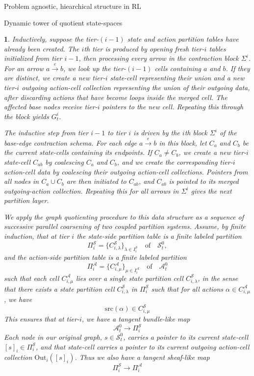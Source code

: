 \documentclass[11pt]{article}
\newtheorem{ermark}[subsubsection]{}
\begin{document}
\begin{section}{Problem agnostic, hiearchical structure in RL}
\begin{subsection}{Dynamic tower of quotient state-spaces}
\begin{ermark}
Inductively, suppose the tier-$(i-1)$ state and action partition tables have already been created. The $i$th tier is produced by opening fresh tier-$i$ tables initialized from tier $i-1$, then processing every arrow in the contraction block $\Sigma^i$. For an arrow $a\xrightarrow{\ e\ }b$, we look up the tier-$(i-1)$ cells containing $a$ and $b$. If they are distinct, we create a new tier-$i$ state-cell representing their union and a new tier-$i$ outgoing action-cell collection representing the union of their outgoing data, after discarding actions that have become loops inside the merged cell. The affected base nodes receive tier-$i$ pointers to the new cell. Repeating this through the block yields $G_t^i$.

The inductive step from tier $i-1$ to tier $i$ is driven by the $i$th block $\Sigma^i$ of the base-edge contraction schema. For each edge $a\xrightarrow{\ e\ }b$ in this block, let $C_a$ and $C_b$ be the current state-cells containing its endpoints. If $C_a\neq C_b$, we create a new tier-$i$ state-cell $C_{ab}$ by coalescing $C_a$ and $C_b$, and we create the corresponding tier-$i$ action-cell data by coalescing their outgoing action-cell collections. Pointers from all nodes in $C_a\cup C_b$ are then initiated to $C_{ab}$, and $C_{ab}$ is pointed to its merged outgoing-action collection. Repeating this for all arrows in $\Sigma^i$ gives the next partition layer.

We apply the graph quotienting procedure to this data structure as a sequence of successive parallel coarsening of two coupled partition systems. Assume, by finite induction, that at tier $i$ the \emph{state-side partition table} is a finite labeled partition
\[
\Pi_i^{\mathcal S}=\{C_{i,\lambda}^{\mathcal S}\}_{\lambda\in I_i^{\mathcal S}}
\quad\text{of}\quad\mathcal{S}_t^0,
\]
and the \emph{action-side partition table} is a finite labeled partition
\[
\Pi_i^{\mathcal A}=\{C_{i,\mu}^{\mathcal A}\}_{\mu\in I_i^{\mathcal A}}
\quad\text{of}\quad\mathcal{A}_t^0
\]
such that each cell $C_{i,\mu}^{\mathcal A}$ lies over a single state partition cell $C_{i,\lambda}^{\mathcal S}$, in the sense that there exists a state partition cell $C_{i,\lambda}^{\mathcal S}$ in $\Pi_i^{\mathcal S}$ such that for all actions $\alpha\in C_{i,\mu}^{\mathcal A}$, we have
	$$
	\text{src}(\alpha)\in C_{i,\mu}^{\mathcal S}
	$$
This ensures that at tier-$i$, we have a tangent bundle-like map 
$$
\mathcal{A}^{0}_{t}\longrightarrow\Pi_i^{\mathcal S}
$$
Each node in our original graph, $s\in\mathcal{S}_t^0$, carries a pointer to its current state-cell $[s]_i\in\Pi_i^{\mathcal S}$, and that state-cell carries a pointer to its current outgoing action-cell collection $\mathrm{Out}_i([s]_i)$. Thus we also have a tangent sheaf-like map
$$
\Pi_i^{\mathcal S}\longrightarrow\Pi_i^{\mathcal A}
$$


\end{ermark}
\end{subsection}
\end{section}
\end{document}
